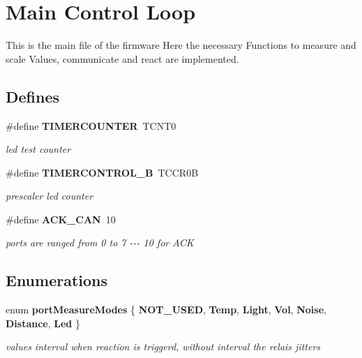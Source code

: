 \section{\-Main \-Control \-Loop}
\label{group__main}


\-This is the main file of the firmware \-Here the necessary \-Functions to measure and scale \-Values, communicate and react are implemented.  


\subsection*{\-Defines}
\begin{DoxyCompactItemize}
\item 
\#define {\bf \-T\-I\-M\-E\-R\-C\-O\-U\-N\-T\-E\-R}~\-T\-C\-N\-T0\label{group__main_ga1a329b3e30dfee7d342abb5ca42627c1}

\begin{DoxyCompactList}\small\item\em led test counter \end{DoxyCompactList}\item 
\#define {\bf \-T\-I\-M\-E\-R\-C\-O\-N\-T\-R\-O\-L\-\_\-\-B}~\-T\-C\-C\-R0\-B\label{group__main_ga92b6fba9f92d06d079d00bd6df3176d9}

\begin{DoxyCompactList}\small\item\em prescaler led counter \end{DoxyCompactList}\item 
\#define {\bf \-A\-C\-K\-\_\-\-C\-A\-N}~10\label{group__main_gaa267303b3341b8fb4d5229ef059d6c4b}

\begin{DoxyCompactList}\small\item\em ports are ranged from 0 to 7 -\/-\/-\/ 10 for \-A\-C\-K \end{DoxyCompactList}\end{DoxyCompactItemize}
\subsection*{\-Enumerations}
\begin{DoxyCompactItemize}
\item 
enum {\bf port\-Measure\-Modes} \{ \*
{\bfseries \-N\-O\-T\-\_\-\-U\-S\-E\-D}, 
{\bfseries \-Temp}, 
{\bfseries \-Light}, 
{\bfseries \-Vol}, 
\*
{\bfseries \-Noise}, 
{\bfseries \-Distance}, 
{\bfseries \-Led}
 \}
\begin{DoxyCompactList}\small\item\em values interval when reaction is triggerd, without interval the relais jitters \end{DoxyCompactList}\end{DoxyCompactItemize}
